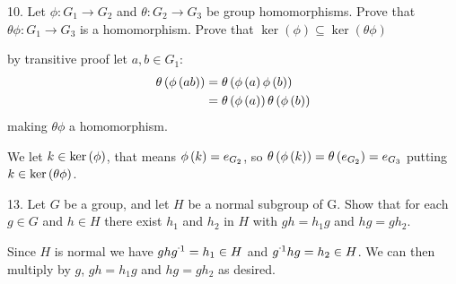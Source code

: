 \newpage
\begin{mdframed}[style=darkQuesion]
  10. Let $\phi: G_{1} \rightarrow G_{2}$ and $\theta: G_{2} \rightarrow G_{3}$ be group homomorphisms. Prove that
  $\theta \phi: G_{1} \rightarrow G_{3}$ is a homomorphism. Prove that $\operatorname{ker}(\phi) \subseteq \operatorname{ker}(\theta \phi)$
\end{mdframed}
\begin{mdframed}[style=darkAnswer,frametitle={Joe Starr}]
by transitive proof let $a,b\in G_1$:
\begin{align*}
  \theta\left(\phi\left(ab\right)\right)&=\theta\left(\phi\left(a\right)\phi\left(b\right)\right)\\
  &=\theta\left(\phi\left(a\right)\right)\theta\left(\phi\left(b\right)\right)\\
\end{align*}
making $\theta\phi$ a homomorphism. 

We let $k\in \text{ker}\left(\phi\right)$, that means $\phi\left(k\right)=e_{G_2}$, so 
$\theta\left(\phi\left(k\right)\right)=\theta\left(e_{G_2}\right)=e_{G_3}$ putting 
$k\in \text{ker}\left(\theta\phi\right)$.
\end{mdframed}
\newpage
\begin{mdframed}[style=darkQuesion]
  13. Let $G$ be a group, and let $H$ be a normal subgroup of G. Show that for 
  each $g\in G$ and $h\in H$ there exist $h_1$ and $h_2$ in $H$ with $gh=h_1g$
  and $hg=gh_2$.
\end{mdframed}
\begin{mdframed}[style=darkAnswer,frametitle={Joe Starr}]
Since $H$ is normal we have $gh\inv{g}=h_1\in H$ and $\inv{g}hg=h_2\in H$. 
We can then multiply by $g$, $gh=h_1g$ and $hg=gh_2$ as desired. 
\end{mdframed}
\newpage
